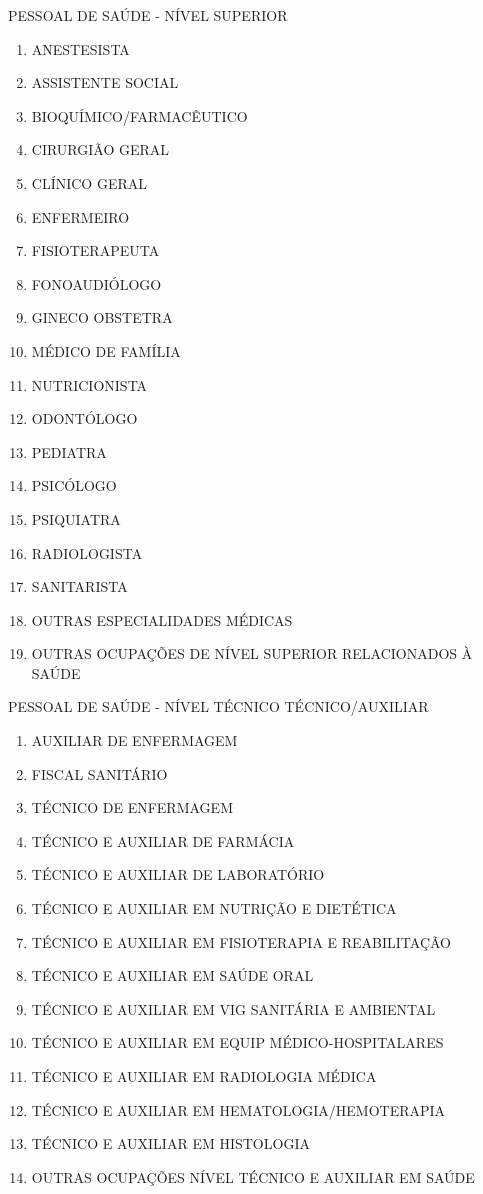 \documentclass[a4paper,11pt]{article}
\begin{document}
PESSOAL DE SAÚDE - NÍVEL SUPERIOR
\begin{enumerate}
    \item ANESTESISTA
    \item ASSISTENTE SOCIAL
    \item BIOQUÍMICO/FARMACÊUTICO
    \item CIRURGIÃO GERAL
    \item CLÍNICO GERAL
    \item ENFERMEIRO
    \item FISIOTERAPEUTA
    \item FONOAUDIÓLOGO
    \item GINECO OBSTETRA
    \item MÉDICO DE FAMÍLIA
    \item NUTRICIONISTA
    \item ODONTÓLOGO
    \item PEDIATRA
    \item PSICÓLOGO
    \item PSIQUIATRA
    \item RADIOLOGISTA
    \item SANITARISTA
    \item OUTRAS ESPECIALIDADES MÉDICAS
    \item OUTRAS OCUPAÇÕES DE NÍVEL SUPERIOR RELACIONADOS À SAÚDE
\end{enumerate}
PESSOAL DE SAÚDE - NÍVEL TÉCNICO TÉCNICO/AUXILIAR
\begin{enumerate}
    \item AUXILIAR DE ENFERMAGEM
    \item FISCAL SANITÁRIO
    \item TÉCNICO DE ENFERMAGEM
    \item TÉCNICO E AUXILIAR DE FARMÁCIA
    \item TÉCNICO E AUXILIAR DE LABORATÓRIO
    \item TÉCNICO E AUXILIAR EM NUTRIÇÃO E DIETÉTICA
    \item TÉCNICO E AUXILIAR EM FISIOTERAPIA E REABILITAÇÃO
    \item TÉCNICO E AUXILIAR EM SAÚDE ORAL
    \item TÉCNICO E AUXILIAR EM VIG SANITÁRIA E AMBIENTAL
    \item TÉCNICO E AUXILIAR EM EQUIP MÉDICO-HOSPITALARES
    \item TÉCNICO E AUXILIAR EM RADIOLOGIA MÉDICA
    \item TÉCNICO E AUXILIAR EM HEMATOLOGIA/HEMOTERAPIA
    \item TÉCNICO E AUXILIAR EM HISTOLOGIA
    \item OUTRAS OCUPAÇÕES NÍVEL TÉCNICO E AUXILIAR EM SAÚDE
\end{enumerate}
\end{document}
